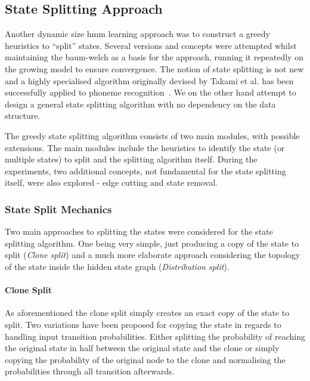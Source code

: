 \subsection{State Splitting Approach}
\label{sec:state_splitting}
Another dynamic size \gls{hmm} learning approach was to construct a greedy heuristics to ``split'' states. Several versions and concepts were attempted whilst maintaining the \gls{baum-welch} as a basis for the approach, running it repeatedly on the growing model to ensure convergence. The notion of state splitting is not new and a highly specialised algorithm originally devised by Takami et al. has been successfully applied to phoneme recognition~\cite{takami1992, singer1996}. We on the other hand attempt to design a general state splitting algorithm with no dependency on the data structure.

The greedy state splitting algorithm consists of two main modules, with possible extensions. The main modules include the heuristics to identify the state (or multiple states) to split and the splitting algorithm itself. During the experiments, two additional concepts, not fundamental for the state splitting itself, were also explored - edge cutting and state removal.

\subsubsection{State Split Mechanics}
Two main approaches to splitting the states were considered for the state splitting algorithm. One being very simple, just producing a copy of the state to split (\emph{Clone split}) and a much more elaborate approach considering the topology of the state inside the hidden state graph (\emph{Distribution split}).

\paragraph{Clone Split}
As aforementioned the clone split simply creates an exact copy of the state to split. Two variations have been proposed for copying the state in regards to handling input transition probabilities. Either splitting the probability of reaching the original state in half between the original state and the clone or simply copying the probability of the original node to the clone and normalising the probabilities through all transition afterwards.

